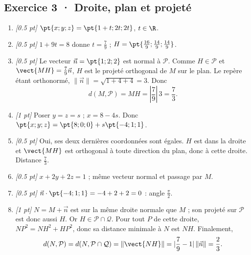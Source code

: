 \subsection*{Exercice 3 · Droite, plan et projeté}\begin{enumerate}

\item \textit{[\num{0,5} pt]} $\pt{x;y;z}=\pt{1+t;2t;2t}$, $t\in\R$.

\item \textit{[\num{0,5} pt]} $1+9t=8$ donne $t=\frac{7}{9}$ ; $H=\pt{\frac{16}{9};\frac{14}{9};\frac{14}{9}}$.

\item \textit{[\num{0,5} pt]} Le vecteur $\vec n=\pt{1;2;2}$ est normal à $\mathcal P$. Comme $H\in\mathcal P$ et $\vect{MH}=\frac{7}{9}\vec n$, $H$ est le projeté orthogonal de $M$ sur le plan. Le repère étant orthonormé, $\|\vec n\|=\sqrt{1+4+4}=3$. Donc
\[d(M,\mathcal P)=MH=|\frac{7}{9}|\,3=\frac{7}{3}.\]

\item \textit{[1 pt]} Poser $y=z=s$ ; $x=8-4s$. Donc $\pt{x;y;z}=\pt{8;0;0}+s\pt{-4;1;1}$.

\item \textit{[\num{0,5} pt]} Oui, ses deux dernières coordonnées sont égales. $H$ est dans la droite et $\vect{MH}$ est orthogonal à toute direction du plan, donc à cette droite. Distance $\frac{7}{3}$.

\item \textit{[\num{0,5} pt]} $x+2y+2z=1$ ; même vecteur normal et passage par $M$.

\item \textit{[\num{0,5} pt]} $\vec n\cdot\pt{-4;1;1}=-4+2+2=0$ : angle $\frac{\pi}{2}$.

\item \textit{[1 pt]} $N=M+\vec n$ est sur la même droite normale que $M$ ; son projeté sur $\mathcal P$ est donc aussi $H$. Or $H\in\mathcal P\cap\mathcal Q$. Pour tout $P$ de cette droite, $NP^2=NH^2+HP^2$, donc sa distance minimale à $N$ est $NH$. Finalement,
\[d(N,\mathcal P)=d(N,\mathcal P\cap\mathcal Q)=\|\vect{NH}\|=|\frac{7}{9}-1|\,\|\vec n\|=\frac{2}{3}.\]

\end{enumerate}

